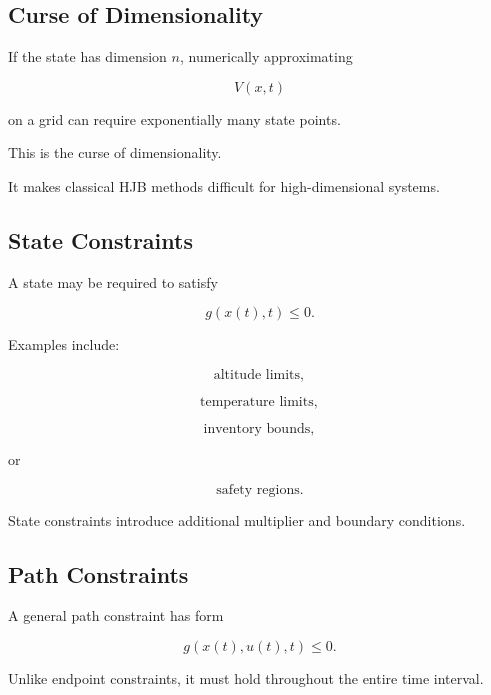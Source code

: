 \subsection{Curse of Dimensionality}
\label{subsec:optimal-control-curse-dimensionality}

If the state has dimension \(n\), numerically approximating

\[
V(x,t)
\]

on a grid can require exponentially many state points.

This is the curse of dimensionality.

It makes classical HJB methods difficult for high-dimensional systems.

\subsection{State Constraints}
\label{subsec:optimal-control-state-constraints}

A state may be required to satisfy

\[
\boxed{
g(x(t),t)
\leq
0.
}
\]

Examples include:

\[
\boxed{
\text{altitude limits},
}
\]

\[
\boxed{
\text{temperature limits},
}
\]

\[
\boxed{
\text{inventory bounds},
}
\]

or

\[
\boxed{
\text{safety regions}.
}
\]

State constraints introduce additional multiplier and boundary conditions.

\subsection{Path Constraints}
\label{subsec:path-constraints}

A general path constraint has form

\[
\boxed{
g
(
x(t),
u(t),
t
)
\leq
0.
}
\]

Unlike endpoint constraints, it must hold throughout the entire time
interval.

